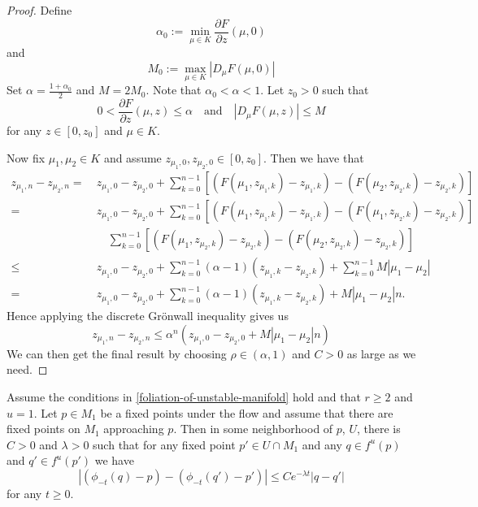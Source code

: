 \begin{proof}
	Define 
	\begin{equation}
		\alpha_0 := \min_{\mu\in K } \frac{\partial F}{\partial z} (\mu, 0) 
	\end{equation} 
	and 
	\begin{equation}
		M_0 := \max_{\mu\in K} \left| D_\mu F (\mu, 0) \right|
	\end{equation}
	Set \(\alpha = \frac{1 + \alpha_0}{2}\) and \(M = 2M_0\). Note that \(\alpha_0 < \alpha < 1\). Let \(z_0 > 0\) such that 
	\begin{equation}
		0 < \frac{\partial F}{\partial z} (\mu, z) \leq \alpha \quad \text{and} \quad \left| D_\mu F (\mu, z) \right| \leq M
	\end{equation}
	for any \(z \in [0,z_0]\) and \(\mu \in K\). 
	
	Now fix \(\mu_1,\mu_2\in K\) and assume \(z_{\mu_1, 0}, z_{\mu_2,0} \in [0,z_0]\). Then we have that 
	\begin{align*}
		z_{\mu_1, n} - z_{\mu_2, n}=\ &z_{\mu_1, 0}- z_{\mu_2, 0} + \sum_{k=0}^{n-1} [(F(\mu_1, z_{\mu_1,k} ) - z_{\mu_1, k}) - (F(\mu_2, z_{\mu_2,k} ) - z_{\mu_2, k})]\\
		=\ &z_{\mu_1, 0}- z_{\mu_2, 0} + \sum_{k=0}^{n-1} [(F(\mu_1, z_{\mu_1,k} ) - z_{\mu_1, k}) - (F(\mu_1, z_{\mu_2,k} ) - z_{\mu_2, k})] \\
		&\quad\sum_{k=0}^{n-1} [(F(\mu_1, z_{\mu_2,k} ) - z_{\mu_2, k}) - (F(\mu_2, z_{\mu_2,k} ) - z_{\mu_2, k})] \\
		\leq\ &z_{\mu_1, 0}- z_{\mu_2, 0} + \sum_{k=0}^{n-1} (\alpha - 1) (z_{\mu_1, k}- z_{\mu_2, k}) +\sum_{k=0}^{n-1} M|\mu_1 - \mu_2| \\
		=\ &z_{\mu_1, 0}- z_{\mu_2, 0} + \sum_{k=0}^{n-1} (\alpha - 1) (z_{\mu_1, k}- z_{\mu_2, k}) +M|\mu_1 - \mu_2| n.
	\end{align*}
	Hence applying the discrete Gr\"onwall inequality gives us
	\begin{equation}
		z_{\mu_1, n} - z_{\mu_2, n} \leq \alpha^n(z_{\mu_1, 0}- z_{\mu_2, 0} + M |\mu_1-\mu_2| n)
	\end{equation}
	We can then get the final result by choosing \(\rho \in (\alpha, 1)\) and \(C>0\) as large as we need.
\end{proof}

\begin{prop}\label{distance-to-fixed-point}
	Assume the conditions in \cref{foliation-of-unstable-manifold} hold and that \(r\geq 2\) and \(u = 1\). Let \(p \in {M}_1\) be a fixed points under the flow and assume that there are fixed points on \( M_1\) approaching \(p\). Then in some neighborhood of \(p\), \(U\), there is \(C> 0 \) and \(\lambda > 0\) such that for any fixed point \(p'\in U\cap M_1\) and any \(q \in f^u(p)\) and \(q'\in f^u(p')\) we have
	\begin{equation}
		|(\phi_{-t}(q) - p) - (\phi_{-t}(q') - p')| \leq C e^{-\lambda t} | q - q'|
	\end{equation}
	for any \(t\geq 0.\)
\end{prop}


